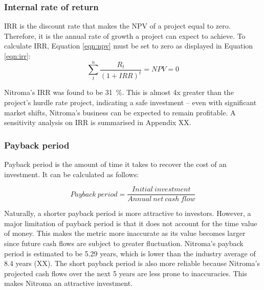 \subsubsection{Internal rate of return}
IRR is the discount rate that makes the NPV of a project equal to zero. Therefore, it is the annual rate of growth a project can expect to achieve. To calculate IRR, Equation \ref{eqn:npv} must be set to zero as displayed in Equation \ref{eqn:irr}:
\begin{equation}
\label{eqn:irr}
    \sum_t^n\frac{R_{t}}{(1+IRR)^{t}}=NPV=0
\end{equation}

Nitroma’s IRR was found to be \SI{31}{\percent}. This is almost 4x greater than the project’s hurdle rate project, indicating a safe investment – even with significant market shifts, Nitroma’s business can be expected to remain profitable. A sensitivity analysis on IRR is summarised in Appendix XX.

\subsubsection{Payback period}
\label{sec:pby}
Payback period is the amount of time it takes to recover the cost of an investment. It can be calculated as follows:

\begin{equation}
\label{eqn:payback}
    Payback\:period = \frac{Initial\:investment}{Annual\:net\:cash\:flow}
\end{equation}

Naturally, a shorter payback period is more attractive to investors. However, a major limitation of payback period is that it does not account for the time value of money. This makes the metric more inaccurate as its value becomes larger since future cash flows are subject to greater fluctuation. Nitroma’s payback period is estimated to be 5.29 years, which is lower than the industry average of 8.4 years (XX).  The short payback period is also more reliable because Nitroma’s projected cash flows over the next 5 years are less prone to inaccuracies. This makes Nitroma an attractive investment. 


